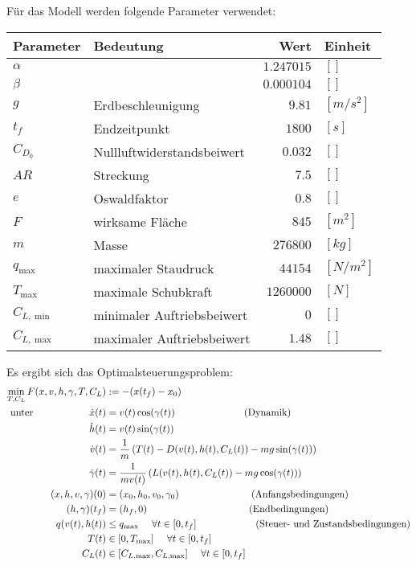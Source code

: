 Für das Modell werden folgende Parameter verwendet:
\begin{center}
\begin{tabular}{|l|l|r|l|}
\hline
Parameter & Bedeutung & Wert & Einheit \\ 
\hline 
$\alpha$ &  & $1.247015$ & $[]$ \\ 
$\beta$ &  & $0.000104$ & $[]$ \\ 
$g$ & Erdbeschleunigung & $9.81$ & $[m/s^2]$ \\ 
$t_f$ & Endzeitpunkt & $1800$ & $[s]$ \\ 
$C_{D_0}$ & Nullluftwiderstandsbeiwert & $0.032$ & $[]$ \\ 
$AR$ & Streckung & $7.5$ & $[]$ \\ 
$e$ & Oswaldfaktor & $0.8$ & $[]$ \\ 
$F$ & wirksame Fläche & $845$ & $[m^2]$ \\ 
$m$ & Masse & $276800$ & $[kg]$ \\ 
$q_{\max}$ & maximaler Staudruck & $44154$ & $[N/m^2]$ \\ 
$T_{\max}$ & maximale Schubkraft & $1260000$ & $[N]$ \\ 
$C_{L, \min}$ & minimaler Auftriebsbeiwert & $0$ & $[]$ \\ 
$C_{L, \max}$ & maximaler Auftriebsbeiwert & $1.48$ & $[]$ \\ 
\hline
\end{tabular} 
\end{center}

Es ergibt sich das Optimalsteuerungsproblem:
\[\begin{split}
\min_{T, C_L} F(x,v,h,\gamma,T,C_L) &:= -(x(t_f) - x_0) \\\
\text{unter}  \hspace{20mm} \dot{x}(t) &= v(t) \cos(\gamma(t)) \ \qquad \qquad \qquad  \ \ \text{(Dynamik)}\\\
\dot{h}(t) &= v(t) \sin(\gamma(t)) \\\
\dot{v}(t) &= \dfrac{1}{m} \left( T(t) - D(v(t),h(t),C_L(t)) - mg \sin(\gamma(t)) \right) \\\
\dot{\gamma}(t) &=  \dfrac{1}{mv(t)} \left( L(v(t),h(t),C_L(t)) - mg \cos(\gamma(t)) \right) \\\
%
(x,h,v,\gamma)(0) &= (x_0,h_0,v_0,\gamma_0) \qquad \qquad \qquad \ \ \ \ \text{(Anfangsbedingungen)}\\\
(h,\gamma)(t_f) &= (h_f,0) \qquad \qquad \qquad \qquad \qquad  \  \text{(Endbedingungen)}\\\
%
q(v(t),h(t)) &\leq q_{\max} \ \ \ \ \forall t \in [0,t_f] \qquad \qquad  \ \ \ \ \ \ \text{(Steuer- und Zustandsbedingungen)}\\\
T(t) &\in [0,T_{\max}] \ \ \ \ \forall t \in [0,t_f] \\\
C_L(t) &\in [C_{L, \max},C_{L, \max}] \ \ \ \ \forall t \in [0,t_f] \\\
\end{split} \]

